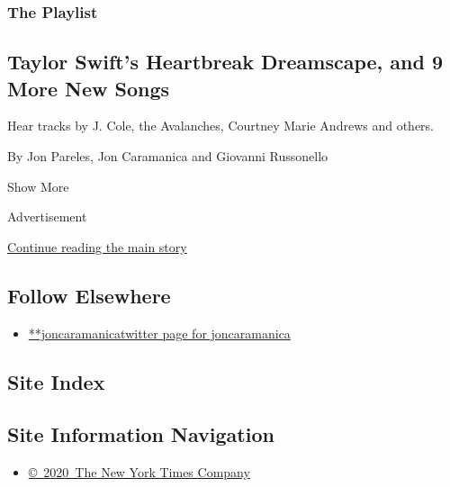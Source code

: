 \begin{enumerate}
  \hypertarget{the-playlist-3}{%
  \subsubsection{The Playlist}\label{the-playlist-3}}

  \hypertarget{taylor-swifts-heartbreak-dreamscape-and-9-more-new-songs}{%
  \subsection{Taylor Swift's Heartbreak Dreamscape, and 9 More New
  Songs}\label{taylor-swifts-heartbreak-dreamscape-and-9-more-new-songs}}

  Hear tracks by J. Cole, the Avalanches, Courtney Marie Andrews and
  others.

  By Jon Pareles, Jon Caramanica and Giovanni Russonello
\end{enumerate}

Show More

Advertisement

\protect\hyperlink{after-mid2}{Continue reading the main story}

\hypertarget{follow-elsewhere}{%
\subsection{Follow Elsewhere}\label{follow-elsewhere}}

\begin{itemize}
\tightlist
\item
  \href{https://twitter.com/joncaramanica}{**joncaramanicatwitter page
  for joncaramanica}
\end{itemize}

\hypertarget{site-index}{%
\subsection{Site Index}\label{site-index}}

\hypertarget{site-information-navigation}{%
\subsection{Site Information
Navigation}\label{site-information-navigation}}

\begin{itemize}
\tightlist
\item
  \href{https://help.nytimes3xbfgragh.onion/hc/en-us/articles/115014792127-Copyright-notice}{©~2020~The
  New York Times Company}
\end{itemize}

